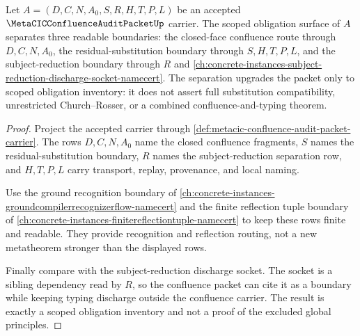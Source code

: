\begin{theorem}
\label{thm:metacic-confluence-audit-obligation-scope-upgrade}
Let $A=(D,C,N,A_0,S,R,H,T,P,L)$ be an accepted
$\MetaCICConfluenceAuditPacketUp$ carrier. The scoped obligation surface of
$A$ separates three readable boundaries: the closed-face confluence route
through $D,C,N,A_0$, the residual-substitution boundary through $S,H,T,P,L$,
and the subject-reduction boundary through $R$ and
\autoref{ch:concrete-instances-subject-reduction-discharge-socket-namecert}.
The separation upgrades the packet only to scoped obligation inventory: it
does not assert full substitution compatibility, unrestricted Church--Rosser,
or a combined confluence-and-typing theorem.
\end{theorem}
\begin{proof}
Project the accepted carrier through
\autoref{def:metacic-confluence-audit-packet-carrier}. The rows $D,C,N,A_0$
name the closed confluence fragments, $S$ names the residual-substitution
boundary, $R$ names the subject-reduction separation row, and $H,T,P,L$ carry
transport, replay, provenance, and local naming.

Use the ground recognition boundary of
\autoref{ch:concrete-instances-groundcompilerrecognizerflow-namecert} and the
finite reflection tuple boundary of
\autoref{ch:concrete-instances-finitereflectiontuple-namecert} to keep these
rows finite and readable. They provide recognition and reflection routing, not
a new metatheorem stronger than the displayed rows.

Finally compare with the subject-reduction discharge socket. The socket is a
sibling dependency read by $R$, so the confluence packet can cite it as a
boundary while keeping typing discharge outside the confluence carrier. The
result is exactly a scoped obligation inventory and not a proof of the
excluded global principles.
\end{proof}

